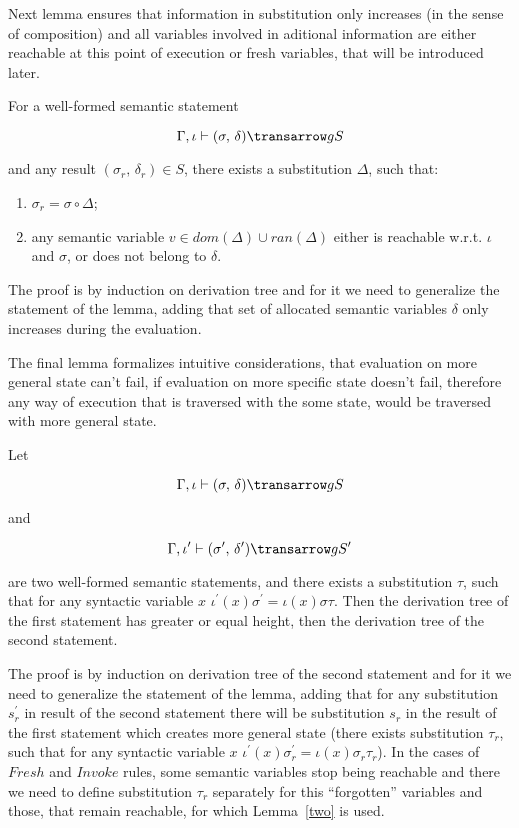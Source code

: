 Next lemma ensures that information in substitution only increases (in the sense of composition) and all variables involved in aditional information are either reachable at this point of execution or fresh variables, that will be introduced later.

\begin{lemma}
\label{two}
\normalfont
For a well-formed semantic statement 

$$
\otrans{\Gamma,\iota}{(\sigma,\,\delta)}{g}{S}
$$ 

\noindent and any result \mbox{$(\sigma_r,\,\delta_r) \in S$}, there exists a substitution $\Delta$, such that:
  \begin{enumerate}
    \item \mbox{$\sigma_r = \sigma\circ\Delta$};
    \item any semantic variable \mbox{$v\in dom(\Delta)\cup ran(\Delta)$} either is reachable w.r.t. $\iota$ and $\sigma$,
 or does not belong to $\delta$.
  \end{enumerate}   
\end{lemma}

The proof is by induction on derivation tree and for it we need to generalize the statement of the lemma, adding that set of allocated semantic variables $\delta$ only increases during the evaluation.

The final lemma formalizes intuitive considerations, that evaluation on more general state can't fail, if evaluation on more specific state doesn't fail, therefore any way of execution that is traversed with the some state, would be traversed with more general state.

\begin{lemma}
\label{three}
\normalfont
Let 

$$
\otrans{\Gamma,\iota}{(\sigma,\,\delta)}{g}{S}
$$ 

and 

$$\otrans{\Gamma,\iota^\prime}{(\sigma^\prime,\,\delta^\prime)}{g}{S^\prime}
$$

\noindent are two well-formed semantic statements, and there exists a substitution $\tau$, such that 
for any syntactic variable $x$ \mbox{$\iota^\prime(x) \sigma^\prime = \iota(x) \sigma \tau$}. Then the 
derivation tree of the first statement has greater or equal height, then the derivation 
tree of the second statement.
\end{lemma}

The proof is by induction on derivation tree of the second statement and for it we need to generalize the statement of the lemma, adding that for any substitution $s^\prime_r$ in result of the second statement there will be substitution $s_r$ in the result of the first statement which creates more general state (there exists substitution $\tau_r$, such that for any syntactic variable $x$ \mbox{$\iota^\prime(x) \sigma^\prime_r = \iota(x) \sigma_r \tau_r$}). In the cases of $Fresh$ and $Invoke$ rules, some semantic variables stop being reachable and there we need to define substitution $\tau_r$ separately for this ``forgotten'' variables and those, that remain reachable, for which Lemma~\ref{two} is used.

